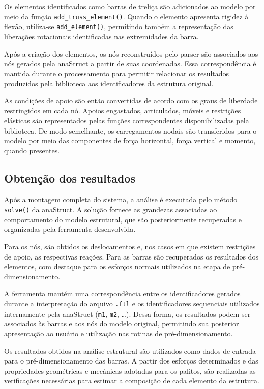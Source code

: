 Os elementos identificados como barras de treliça são adicionados ao modelo por meio da função \texttt{add\_truss\_element()}. Quando o elemento apresenta rigidez à flexão, utiliza-se \texttt{add\_element()}, permitindo também a representação das liberações rotacionais identificadas nas extremidades da barra.

Após a criação dos elementos, os nós reconstruídos pelo parser são associados aos nós gerados pela anaStruct a partir de suas coordenadas. Essa correspondência é mantida durante o processamento para permitir relacionar os resultados produzidos pela biblioteca aos identificadores da estrutura original.

As condições de apoio são então convertidas de acordo com os graus de liberdade restringidos em cada nó. Apoios engastados, articulados, móveis e restrições elásticas são representados pelas funções correspondentes disponibilizadas pela biblioteca. De modo semelhante, os carregamentos nodais são transferidos para o modelo por meio das componentes de força horizontal, força vertical e momento, quando presentes.

\subsection{Obtenção dos resultados}
\label{subsec:obtencao-resultados}

Após a montagem completa do sistema, a análise é executada pelo método \texttt{solve()} da anaStruct. A solução fornece as grandezas associadas ao comportamento do modelo estrutural, que são posteriormente recuperadas e organizadas pela ferramenta desenvolvida.

Para os nós, são obtidos os deslocamentos e, nos casos em que existem restrições de apoio, as respectivas reações. Para as barras são recuperados os resultados dos elementos, com destaque para os esforços normais utilizados na etapa de pré-dimensionamento.

A ferramenta mantém uma correspondência entre os identificadores gerados durante a interpretação do arquivo \texttt{.ftl} e os identificadores sequenciais utilizados internamente pela anaStruct (\texttt{m1}, \texttt{m2}, \dots). Dessa forma, os resultados podem ser associados às barras e aos nós do modelo original, permitindo sua posterior apresentação ao usuário e utilização nas rotinas de pré-dimensionamento.

Os resultados obtidos na análise estrutural são utilizados como dados de entrada para o pré-dimensionamento das barras. A partir dos esforços determinados e das propriedades geométricas e mecânicas adotadas para os palitos, são realizadas as verificações necessárias para estimar a composição de cada elemento da estrutura.

